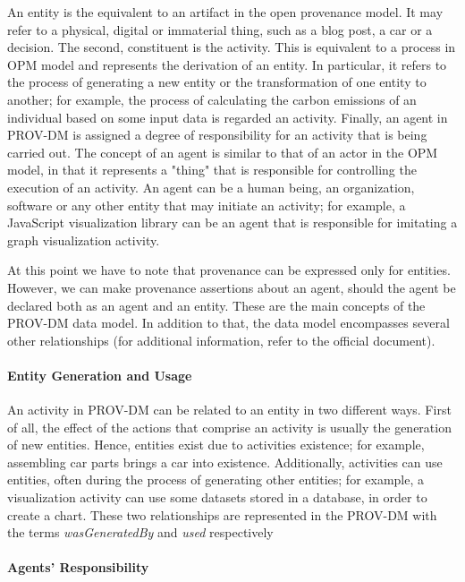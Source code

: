 An entity is the equivalent to an artifact in the open provenance model. It may refer to a physical, digital or immaterial thing, such as a blog post, a car or a decision. The second, constituent is the activity. This is equivalent to a process in OPM model and represents the derivation of an entity. In particular, it refers to the process of generating a new entity or the transformation of one entity to another; for example, the process of calculating the carbon emissions of an individual based on some input data is regarded an activity. Finally, an agent in PROV-DM is assigned a degree of responsibility for an activity that is being carried out. The concept of an agent is similar to that of an actor in the OPM model, in that it represents a "thing" that is responsible for controlling the execution of an activity. An agent can be a human being, an organization, software or any other entity that may initiate an activity; for example, a JavaScript visualization library can be an agent that is responsible for imitating a graph visualization activity.

At this point we have to note that provenance can be expressed only for entities. However, we can make provenance assertions about an agent, should the agent be declared both as an agent and an entity.
These are the main concepts of the PROV-DM data model. In addition to that, the data model encompasses several other relationships (for additional information, refer to the official document\cite{reference15}).


\paragraph{Entity Generation and Usage}

An activity in PROV-DM can be related to an entity in two different ways.  First of all, the effect of the actions that comprise an activity is usually the generation of new entities. Hence, entities exist due to activities existence; for example, assembling car parts brings a car into existence. Additionally, activities can use entities, often during the process of generating other entities; for example, a visualization activity can use some datasets stored in a database, in order to create a chart. These two relationships are represented in the PROV-DM with the terms \emph{wasGeneratedBy} and \emph{used} respectively

\paragraph{Agents' Responsibility}

